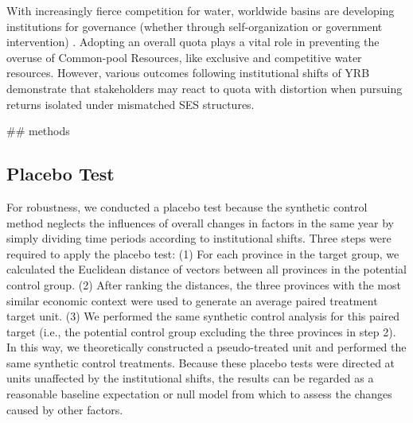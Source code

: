 With increasingly fierce competition for water, worldwide basins are developing institutions for governance (whether through self-organization or government intervention) \cite{andersson2020, wutich2009, cumming2020b}.
Adopting an overall quota plays a vital role in preventing the overuse of Common-pool Resources, like exclusive and competitive water resources.
However, various outcomes following institutional shifts of YRB demonstrate that stakeholders may react to quota with distortion when pursuing returns isolated under mismatched SES structures.


## methods
\subsection{Placebo Test}
For robustness, we conducted a placebo test because the synthetic control method neglects the influences of overall changes in factors in the same year by simply dividing time periods according to institutional shifts. Three steps were required to apply the placebo test:
(1) For each province in the target group, we calculated the Euclidean distance of vectors between all provinces in the potential control group.
(2) After ranking the distances, the three provinces with the most similar economic context were used to generate an average paired treatment target unit.
(3) We performed the same synthetic control analysis for this paired target (i.e., the potential control group excluding the three provinces in step 2).
In this way, we theoretically constructed a pseudo-treated unit and performed the same synthetic control treatments. Because these placebo tests were directed at units unaffected by the institutional shifts, the results can be regarded as a reasonable baseline expectation or null model from which to assess the changes caused by other factors.


